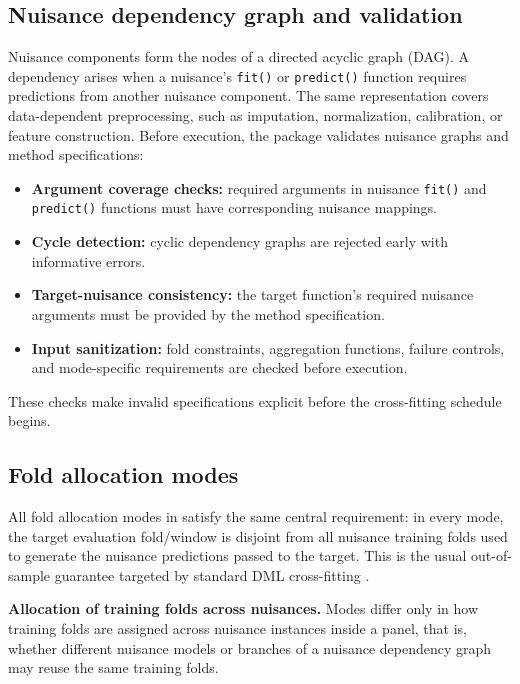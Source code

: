 \subsection{Nuisance dependency graph and validation}\label{subsec:dag-validation}

Nuisance components form the nodes of a directed acyclic graph (DAG). A dependency arises when a nuisance's \texttt{fit()} or \texttt{predict()} function requires predictions from another nuisance component. The same representation covers data-dependent preprocessing, such as imputation, normalization, calibration, or feature construction. Before execution, the package validates nuisance graphs and method specifications:

\begin{itemize}
\tightlist
\item
  \textbf{Argument coverage checks:} required arguments in nuisance \texttt{fit()} and \texttt{predict()} functions must have corresponding nuisance mappings.
\item
  \textbf{Cycle detection:} cyclic dependency graphs are rejected early with informative errors.
\item
  \textbf{Target-nuisance consistency:} the target function's required nuisance arguments must be provided by the method specification.
\item
  \textbf{Input sanitization:} fold constraints, aggregation functions, failure controls, and mode-specific requirements are checked before execution.
\end{itemize}

These checks make invalid specifications explicit before the cross-fitting schedule begins.

\subsection{Fold allocation modes}\label{subsec:allocation}

All fold allocation modes in  satisfy the same central requirement: in every mode, the target evaluation fold/window is disjoint from all nuisance training folds used to generate the nuisance predictions passed to the target. This is the usual out-of-sample guarantee targeted by standard DML cross-fitting \citep{chernozhukov2018, newey2018}.

\textbf{Allocation of training folds across nuisances.} Modes differ only in how training folds are assigned across nuisance instances inside a panel, that is, whether different nuisance models or branches of a nuisance dependency graph may reuse the same training folds.

